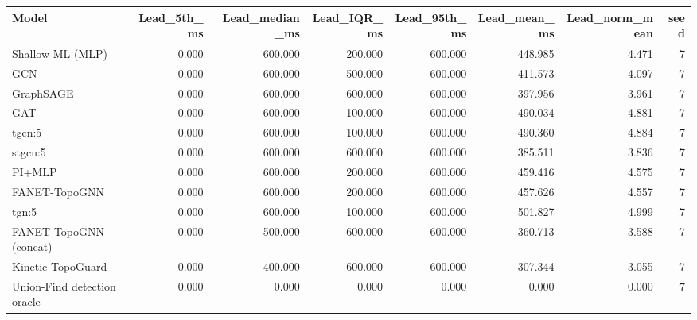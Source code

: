 \begin{tabular}{lrrrrrrr}
\toprule
Model & Lead\_5th\_ms & Lead\_median\_ms & Lead\_IQR\_ms & Lead\_95th\_ms & Lead\_mean\_ms & Lead\_norm\_mean & seed \\
\midrule
Shallow ML (MLP) & 0.000 & 600.000 & 200.000 & 600.000 & 448.985 & 4.471 & 7 \\
GCN & 0.000 & 600.000 & 500.000 & 600.000 & 411.573 & 4.097 & 7 \\
GraphSAGE & 0.000 & 600.000 & 600.000 & 600.000 & 397.956 & 3.961 & 7 \\
GAT & 0.000 & 600.000 & 100.000 & 600.000 & 490.034 & 4.881 & 7 \\
tgcn:5 & 0.000 & 600.000 & 100.000 & 600.000 & 490.360 & 4.884 & 7 \\
stgcn:5 & 0.000 & 600.000 & 600.000 & 600.000 & 385.511 & 3.836 & 7 \\
PI+MLP & 0.000 & 600.000 & 200.000 & 600.000 & 459.416 & 4.575 & 7 \\
FANET-TopoGNN & 0.000 & 600.000 & 200.000 & 600.000 & 457.626 & 4.557 & 7 \\
tgn:5 & 0.000 & 600.000 & 100.000 & 600.000 & 501.827 & 4.999 & 7 \\
FANET-TopoGNN (concat) & 0.000 & 500.000 & 600.000 & 600.000 & 360.713 & 3.588 & 7 \\
Kinetic-TopoGuard & 0.000 & 400.000 & 600.000 & 600.000 & 307.344 & 3.055 & 7 \\
Union-Find detection oracle & 0.000 & 0.000 & 0.000 & 0.000 & 0.000 & 0.000 & 7 \\
\bottomrule
\end{tabular}